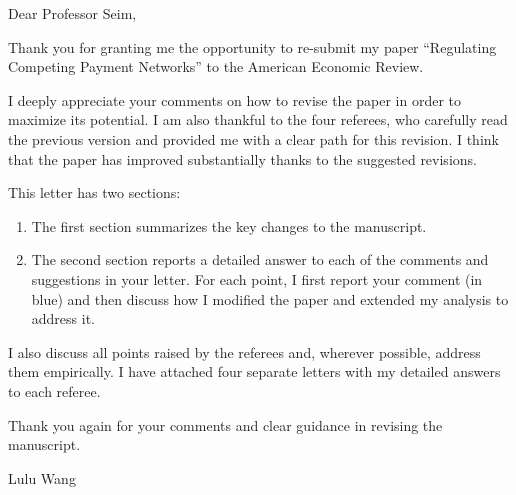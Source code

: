 \documentclass[main.tex]{subfiles}
\begin{document}
\setcounter{footnote}{0}
\setcounter{page}{1}
\renewcommand{\thepage}{E-\arabic{page}}

Dear Professor Seim,

Thank you for granting me the opportunity to re-submit my paper “Regulating Competing Payment Networks” to the American Economic Review.

I deeply appreciate your comments on how to revise the paper in order to maximize its potential. I am also thankful to the four referees, who carefully read the previous version and provided me with a clear path for this revision.
I think that the paper has improved substantially thanks to the suggested revisions.

This letter has two sections:

\begin{enumerate}
    \item The first section summarizes the key changes to the manuscript.
    \item The second section reports a detailed answer to each of the comments and suggestions in your letter. For each point, I first report your comment (in blue) and then discuss how I modified the paper and extended my analysis to address it.
\end{enumerate}

I also discuss all points raised by the referees and, wherever possible, address them empirically.
I have attached four separate letters with my detailed answers to each referee.

Thank you again for your comments and clear guidance in revising the manuscript.

Lulu Wang

\newpage{}


\newpage{}
\end{document}
